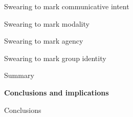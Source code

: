 \begin{listWWNumxleveli}
\begin{listWWNumxlevelii}
\setcounter{listWWNumxleveliii}{0}
\begin{listWWNumxleveliii}
\item 
\begin{styleListParagraph}
Swearing to mark communicative intent
\end{styleListParagraph}
\item 
\begin{styleListParagraph}
Swearing to mark modality
\end{styleListParagraph}
\item 
\begin{styleListParagraph}
Swearing to mark agency
\end{styleListParagraph}
\item 
\begin{styleListParagraph}
Swearing to mark group identity 
\end{styleListParagraph}
\end{listWWNumxleveliii}
\item 
\begin{styleListParagraph}
Summary 
\end{styleListParagraph}
\end{listWWNumxlevelii}
\end{listWWNumxleveli}

\setcounter{listWWNumiileveli}{0}
\begin{listWWNumiileveli}
\item 
\begin{styleListParagraph}
\textbf{Conclusions and implications }
\end{styleListParagraph}
\end{listWWNumiileveli}

\setcounter{listWWNumxileveli}{7}
\begin{listWWNumxileveli}
\item 

\setcounter{listWWNumxilevelii}{0}
\begin{listWWNumxilevelii}
\item 
\begin{styleListParagraph}
Conclusions 
\end{styleListParagraph}
\end{listWWNumxilevelii}
\end{listWWNumxileveli}


